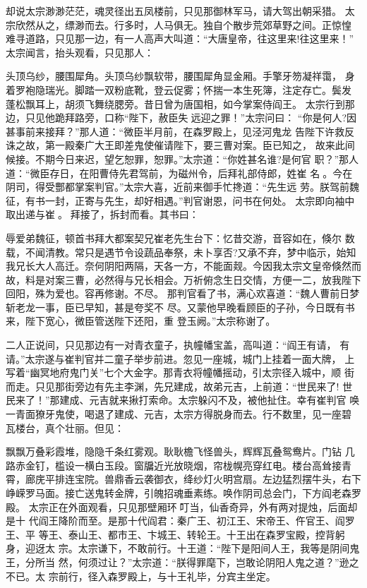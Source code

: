 却说太宗渺渺茫茫，魂灵径出五凤楼前，只见那御林军马，请大驾出朝采猎。
太宗欣然从之，缥渺而去。行多时，人马俱无。独自个散步荒郊草野之间。正惊惶
难寻道路，只见那一边，有一人高声大叫道：“大唐皇帝，往这里来!往这里来！”
太宗闻言，抬头观看，只见那人：

头顶乌纱，腰围犀角。头顶乌纱飘软带，腰围犀角显金厢。手擎牙笏凝祥霭，
身着罗袍隐瑞光。脚踏一双粉底靴，登云促雾；怀揣一本生死簿，注定存亡。鬓发
蓬松飘耳上，胡须飞舞绕腮旁。昔日曾为唐国相，如今掌案侍阎王。
太宗行到那边，只见他跪拜路旁，口称“陛下，赦臣失远迎之罪！”太宗问曰：
“你是何人?因甚事前来接拜？”那人道：“微臣半月前，在森罗殿上，见泾河鬼龙
告陛下许救反诛之故，第一殿秦广大王即差鬼使催请陛下，要三曹对案。臣已知之，
故来此间候接。不期今日来迟，望乞恕罪，恕罪。”太宗道：“你姓甚名谁?是何官
职？”那人道：“微臣存日，在阳曹侍先君驾前，为磁州令，后拜礼部侍郎，姓崔
名。今在阴司，得受酆都掌案判官。”太宗大喜，近前来御手忙搀道：“先生远
劳。朕驾前魏征，有书一封，正寄与先生，却好相遇。”判官谢恩，问书在何处。
太宗即向袖中取出递与崔。拜接了，拆封而看。其书曰：

辱爱弟魏征，顿首书拜大都案契兄崔老先生台下：忆昔交游，音容如在，倏尔
数载，不闻清教。常只是遇节令设蔬品奉祭，未卜享否?又承不弃，梦中临示，始知
我兄长大人高迁。奈何阴阳两隔，天各一方，不能面觌。今因我太宗文皇帝倏然而
故，料是对案三曹，必然得与兄长相会。万祈俯念生日交情，方便一二，放我陛下
回阳，殊为爱也。容再修谢。不尽。
那判官看了书，满心欢喜道：“魏人曹前日梦斩老龙一事，臣已早知，甚是夸奖不
尽。又蒙他早晚看顾臣的子孙，今日既有书来，陛下宽心，微臣管送陛下还阳，重
登玉阙。”太宗称谢了。

二人正说间，只见那边有一对青衣童子，执幢幡宝盖，高叫道：“阎王有请，
有请。”太宗遂与崔判官并二童子举步前进。忽见一座城，城门上挂着一面大牌，
上写着“幽冥地府鬼门关”七个大金字。那青衣将幢幡摇动，引太宗径入城中，顺
街而走。只见那街旁边有先主李渊，先兄建成，故弟元吉，上前道：“世民来了!
世民来了！”那建成、元吉就来揪打索命。太宗躲闪不及，被他扯住。幸有崔判官
唤一青面獠牙鬼使，喝退了建成、元吉，太宗方得脱身而去。行不数里，见一座碧
瓦楼台，真个壮丽。但见：

飘飘万叠彩霞堆，隐隐千条红雾观。耿耿檐飞怪兽头，辉辉瓦叠鸳鸯片。门钻
几路赤金钉，槛设一横白玉段。窗牖近光放晓烟，帘栊幌亮穿红电。楼台高耸接青
霄，廊庑平排连宝院。兽鼎香云袭御衣，绛纱灯火明宫扇。左边猛烈摆牛头，右下
峥嵘罗马面。接亡送鬼转金牌，引魄招魂垂素练。唤作阴司总会门，下方阎老森罗
殿。
太宗正在外面观看，只见那壁厢环叮当，仙香奇异，外有两对提烛，后面却是十
代阎王降阶而至。是那十代阎君：秦广王、初江王、宋帝王、仵官王、阎罗王、平
等王、泰山王、都市王、卞城王、转轮王。十王出在森罗宝殿，控背躬身，迎迓太
宗。太宗谦下，不敢前行。十王道：“陛下是阳间人王，我等是阴间鬼王，分所当
然，何须过让？”太宗道：“朕得罪麾下，岂敢论阴阳人鬼之道？”逊之不已。太
宗前行，径入森罗殿上，与十王礼毕，分宾主坐定。

